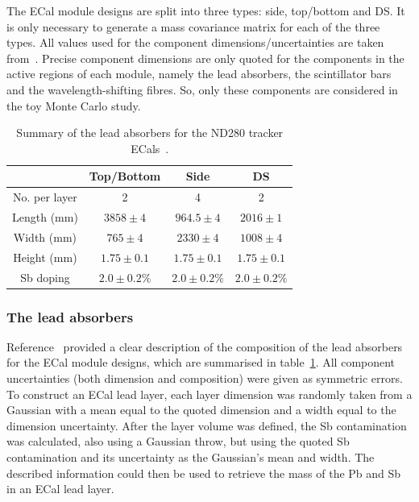 \newline
\newline
The ECal module designs are split into three types: side, top/bottom and DS.  It is only necessary to generate a mass covariance matrix for each of the three types.  All values used for the component dimensions/uncertainties are taken from~\cite{1748-0221-8-10-P10019}.  Precise component dimensions are only quoted for the components in the active regions of each module, namely the lead absorbers, the scintillator bars and the wavelength-shifting fibres.  So, only these components are considered in the toy Monte Carlo study.  
\begin{table}[t!]
  \begin{tabular}{ c c c c }
     & Top/Bottom & Side & DS \\ \hline \hline
  No. per layer & 2 & 4 & 2 \\
  Length (mm) & $3858\pm4$ & $964.5\pm4$ & $2016\pm1$ \\
  Width (mm) & $765\pm4$ & $2330\pm4$ & $1008\pm4$ \\
  Height (mm) & $1.75\pm0.1$ & $1.75\pm0.1$ & $1.75\pm0.1$ \\
  Sb doping & $2.0\pm0.2\%$ & $2.0\pm0.2\%$ & $2.0\pm0.2\%$ \\
  \end{tabular}
  \caption{Summary of the lead absorbers for the ND280 tracker ECals~\cite{1748-0221-8-10-P10019}.}
  \label{table:LeadAbsorberDimensions}
\end{table}


\subsubsection{The lead absorbers}
\label{subsubsec:ECalMassLeadAbsorbers}
Reference~\cite{1748-0221-8-10-P10019} provided a clear description of the composition of the lead absorbers for the ECal module designs, which are summarised in table~\ref{table:LeadAbsorberDimensions}.  All component uncertainties (both dimension and composition) were given as symmetric errors.  To construct an ECal lead layer, each layer dimension was randomly taken from a Gaussian with a mean equal to the quoted dimension and a width equal to the dimension uncertainty.  After the layer volume was defined, the Sb contamination was calculated, also using a Gaussian throw, but using the quoted Sb contamination and its uncertainty as the Gaussian's mean and width.  The described information could then be used to retrieve the mass of the Pb and Sb in an ECal lead layer.

